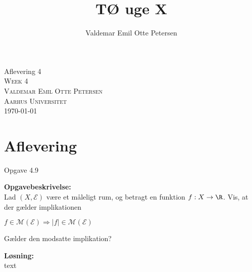\documentclass{article}
\author{Valdemar Emil Otte Petersen}
\title{TØ uge X}
\begin{document}
\begingroup

\centering 
{\LARGE Aflevering 4}\\ %
\vspace*{1\baselineskip}
\scshape
Week 4\\ %
Valdemar Emil Otte Petersen\\ %
{\small Aarhus Universitet}\\ 
{\small \today}

\endgroup

\section{Aflevering}
{\LARGE Opgave 4.9}

\textbf{Opgavebeskrivelse:}\\
Lad $(X, \mathcal{E})$ være et måleligt rum, og betragt en funktion $f: X \rightarrow \R$.
Vis, at der gælder implikationen


$f \in \mathcal{M(E)} \Rightarrow |f| \in \mathcal{M(E)}$

Gælder den modsatte implikation?

\vspace{15px}
\textbf{Løsning:}\\
text
\end{document}
